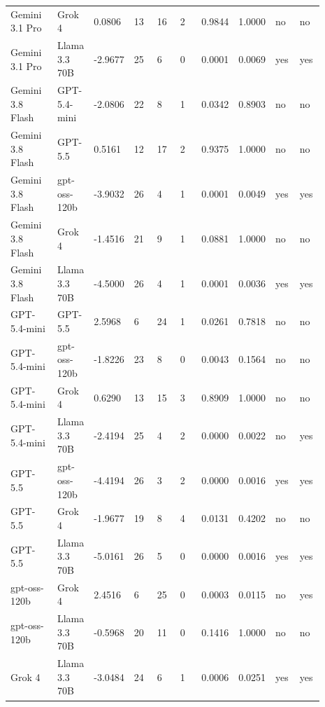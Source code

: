 \begin{landscape}
\begin{longtable}{p{0.162\linewidth}p{0.081\linewidth}p{0.081\linewidth}p{0.081\linewidth}p{0.081\linewidth}p{0.081\linewidth}p{0.081\linewidth}p{0.081\linewidth}p{0.081\linewidth}p{0.081\linewidth}}
Gemini 3.1 Pro & Grok 4 & 0.0806 & 13 & 16 & 2 & 0.9844 & 1.0000 & no & no \\
Gemini 3.1 Pro & Llama 3.3 70B & -2.9677 & 25 & 6 & 0 & 0.0001 & 0.0069 & yes & yes \\
Gemini 3.8 Flash & GPT-5.4-mini & -2.0806 & 22 & 8 & 1 & 0.0342 & 0.8903 & no & no \\
Gemini 3.8 Flash & GPT-5.5 & 0.5161 & 12 & 17 & 2 & 0.9375 & 1.0000 & no & no \\
Gemini 3.8 Flash & gpt-oss-120b & -3.9032 & 26 & 4 & 1 & 0.0001 & 0.0049 & yes & yes \\
Gemini 3.8 Flash & Grok 4 & -1.4516 & 21 & 9 & 1 & 0.0881 & 1.0000 & no & no \\
Gemini 3.8 Flash & Llama 3.3 70B & -4.5000 & 26 & 4 & 1 & 0.0001 & 0.0036 & yes & yes \\
GPT-5.4-mini & GPT-5.5 & 2.5968 & 6 & 24 & 1 & 0.0261 & 0.7818 & no & no \\
GPT-5.4-mini & gpt-oss-120b & -1.8226 & 23 & 8 & 0 & 0.0043 & 0.1564 & no & no \\
GPT-5.4-mini & Grok 4 & 0.6290 & 13 & 15 & 3 & 0.8909 & 1.0000 & no & no \\
GPT-5.4-mini & Llama 3.3 70B & -2.4194 & 25 & 4 & 2 & 0.0000 & 0.0022 & no & yes \\
GPT-5.5 & gpt-oss-120b & -4.4194 & 26 & 3 & 2 & 0.0000 & 0.0016 & yes & yes \\
GPT-5.5 & Grok 4 & -1.9677 & 19 & 8 & 4 & 0.0131 & 0.4202 & no & no \\
GPT-5.5 & Llama 3.3 70B & -5.0161 & 26 & 5 & 0 & 0.0000 & 0.0016 & yes & yes \\
gpt-oss-120b & Grok 4 & 2.4516 & 6 & 25 & 0 & 0.0003 & 0.0115 & no & yes \\
gpt-oss-120b & Llama 3.3 70B & -0.5968 & 20 & 11 & 0 & 0.1416 & 1.0000 & no & no \\
Grok 4 & Llama 3.3 70B & -3.0484 & 24 & 6 & 1 & 0.0006 & 0.0251 & yes & yes \\
\bottomrule
\end{longtable}
\normalsize
\end{landscape}
